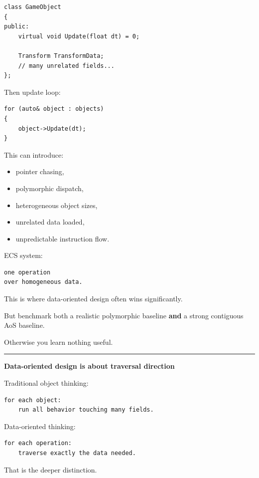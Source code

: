 \begin{verbatim}
class GameObject
{
public:
    virtual void Update(float dt) = 0;

    Transform TransformData;
    // many unrelated fields...
};
\end{verbatim}

Then update loop:

\begin{verbatim}
for (auto& object : objects)
{
    object->Update(dt);
}
\end{verbatim}

This can introduce:

\begin{itemize}
\tightlist
\item
  pointer chasing,
\item
  polymorphic dispatch,
\item
  heterogeneous object sizes,
\item
  unrelated data loaded,
\item
  unpredictable instruction flow.
\end{itemize}

ECS system:

\begin{verbatim}
one operation
over homogeneous data.
\end{verbatim}

This is where data-oriented design often wins significantly.

But benchmark both a realistic polymorphic baseline \textbf{and} a strong contiguous AoS baseline.

Otherwise you learn nothing useful.

\begin{center}\rule{0.5\linewidth}{0.5pt}\end{center}

\textbf{Data-oriented design is about traversal direction}

Traditional object thinking:

\begin{verbatim}
for each object:
    run all behavior touching many fields.
\end{verbatim}

Data-oriented thinking:

\begin{verbatim}
for each operation:
    traverse exactly the data needed.
\end{verbatim}

That is the deeper distinction.

